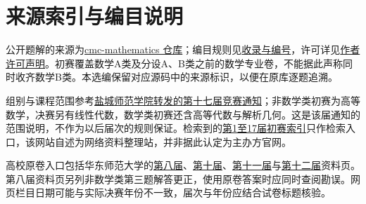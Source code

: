 \documentclass[UTF8,12pt,a4paper,fontset=fandol]{ctexart}
\begin{document}
\section{来源索引与编目说明}

\label{sec:sources}
公开题解的来源为\href{https://github.com/lzxcr/cmc-mathematics}{cmc-mathematics 仓库}；编目规则见\href{https://github.com/lzxcr/cmc-mathematics/blob/64916fa1fdbc3e444a652eca204d5669058ee321/docs/COVERAGE.md}{收录与编号}，许可详见\href{https://github.com/lzxcr/cmc-mathematics/blob/64916fa1fdbc3e444a652eca204d5669058ee321/LICENSE.md}{作者许可声明}。初赛覆盖数学A类及分设A、B类之前的数学专业卷，不能据此声称同时收齐数学B类。本选编保留对应源码中的来源标识，以便在原库逐题追溯。

组别与课程范围参考\href{https://ist.yctu.edu.cn/2025/0926/c3316a140974/page.htm}{盐城师范学院转发的第十七届竞赛通知}；非数学类初赛为高等数学，决赛另有线性代数，数学类初赛还含高等代数与解析几何。这是该届通知的范围说明，不作为以后届次的规则保证。检索到的\href{https://www.cmathc.org.cn/st/560.html}{第1至17届初赛索引}只作检索入口，该网站自述为网络资料整理站，并非据此认定为主办方官网。

高校原卷入口包括华东师范大学的\href{https://math.ecnu.edu.cn/llin/20161022.HTM}{第八届}、\href{https://math.ecnu.edu.cn/llin/20181027.HTM}{第十届}、\href{https://math.ecnu.edu.cn/llin/20191026.HTM}{第十一届}与\href{https://math.ecnu.edu.cn/llin/20201128.HTM}{第十二届}资料页。第八届资料页另列非数学类第三题解答更正，使用原卷答案时应同时查阅勘误。网页栏目日期可能与实际决赛年份不一致，届次与年份应结合试卷标题核验。
\end{document}
